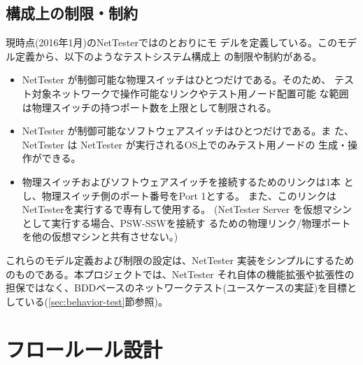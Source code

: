 \subsection{構成上の制限・制約}
現時点(2016年1月)のNetTesterではのとおりにモ
デルを定義している。このモデル定義から、以下のようなテストシステム構成上
の制限や制約がある。
\begin{itemize}
 \item NetTester が制御可能な物理スイッチはひとつだけである。そのため、
       テスト対象ネットワークで操作可能なリンクやテスト用ノード配置可能
       な範囲は物理スイッチの持つポート数を上限として制限される。
 \item NetTester が制御可能なソフトウェアスイッチはひとつだけである。ま
       た、NetTester は NetTester が実行されるOS上でのみテスト用ノードの
       生成・操作ができる。
 \item 物理スイッチおよびソフトウェアスイッチを接続するためのリンクは1本
       とし、物理スイッチ側のポート番号をPort 1とする。
       また、このリンクはNetTesterを実行するで専有して使用する。
       (NetTester Server を仮想マシンとして実行する場合、PSW-SSWを接続す
       るための物理リンク/物理ポートを他の仮想マシンと共有させない。)
\end{itemize}
これらのモデル定義および制限の設定は、NetTester 実装をシンプルにするため
のものである。本プロジェクトでは、NetTester それ自体の機能拡張や拡張性の
担保ではなく、BDDベースのネットワークテスト(ユースケースの実証)を目標と
している(\ref{sec:behavior-test}節参照)。

\section{フロールール設計}

